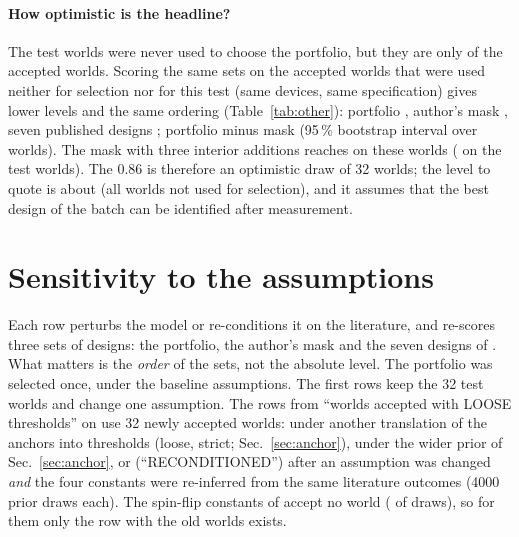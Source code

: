 \paragraph{How optimistic is the headline?} The \nTestWorlds{} test worlds were never used to choose the portfolio, but they are only \nTestWorlds{} of the \nAccepted{} accepted worlds. Scoring the same sets on the \nOtherWorlds{} accepted worlds that were used neither for selection nor for this test (same devices, same specification) gives lower levels and the same ordering (Table~\ref{tab:other}): portfolio \othPortOther{}, author's mask \othMaskOther{}, seven published designs \othSevenOther{}; portfolio minus mask \othDiffPortMaskOther{} (95\,\% bootstrap interval over worlds).
The mask with three interior additions reaches \othMaskIntOther{} on these worlds (\intPlusThree{} on the test worlds). The 0.86 is therefore an optimistic draw of 32 worlds; the level to quote is about \othPortNon{} (all \nNontrainWorlds{} worlds not used for selection), and it assumes that the best design of the batch can be identified after measurement.
\begin{table}[H]\centering\small\tabOther\caption{Expected best-of-batch yield on three sets of accepted worlds, none used to select the designs (\texttt{scripts/other\_worlds\_check.py}).}\label{tab:other}\end{table}

\section{Sensitivity to the assumptions}\label{sec:sens}
Each row perturbs the model or re-conditions it on the literature, and re-scores three sets of designs: the portfolio, the author's mask and the seven designs of \cite{yuan2025apl126}. What matters is the \emph{order} of the sets, not the absolute level. The portfolio was selected once, under the baseline assumptions.
The first rows keep the 32 test worlds and change one assumption. The rows from ``worlds accepted with LOOSE thresholds'' on use 32 newly accepted worlds: under another translation of the anchors into thresholds (loose, strict; Sec.~\ref{sec:anchor}), under the wider prior of Sec.~\ref{sec:anchor}, or (``RECONDITIONED'') after an assumption was changed \emph{and} the four constants were re-inferred from the same literature outcomes (4000 prior draws each).
The spin-flip constants of \cite{chen2026meta} accept no world (\nAccChen{} of \nDrawsChen{} draws), so for them only the row with the old worlds exists.
\begin{table}[H]\centering\scriptsize\tabSens\caption{Expected best-of-batch yield under perturbations (32 worlds per row).}\label{tab:sens}\end{table}
